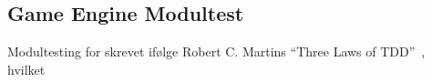 \subsection{Game Engine Modultest}

\noindent Modultesting for \GE{} skrevet ifølge Robert C. Martins 
``Three Laws of TDD''\ \parencite[Side 122]{CleanCode}, hvilket 


